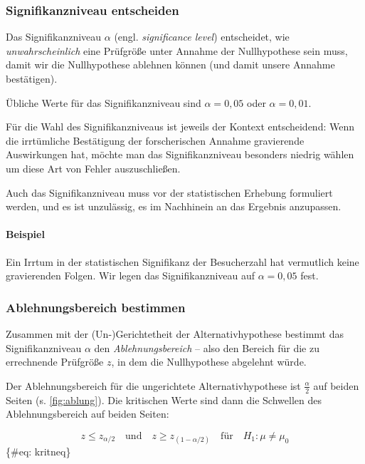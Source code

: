 \documentclass[
  ngerman,
]{article}
\begin{document}
\hypertarget{signifikanzniveau-entscheiden}{%
\subsubsection{Signifikanzniveau entscheiden}\label{signifikanzniveau-entscheiden}}

Das Signifikanzniveau \(\alpha\) (engl. \emph{significance level}) entscheidet, wie \emph{unwahrscheinlich} eine Prüfgröße unter Annahme der Nullhypothese sein muss, damit wir die Nullhypothese ablehnen können (und damit unsere Annahme bestätigen).

Übliche Werte für das Signifikanzniveau sind \(\alpha=0{,}05\) oder \(\alpha=0{,}01\).

Für die Wahl des Signifikanzniveaus ist jeweils der Kontext entscheidend: Wenn die irrtümliche Bestätigung der forscherischen Annahme gravierende Auswirkungen hat, möchte man das Signifikanzniveau besonders niedrig wählen um diese Art von Fehler auszuschließen.

Auch das Signifikanzniveau muss vor der statistischen Erhebung formuliert werden, und es ist unzulässig, es im Nachhinein an das Ergebnis anzupassen.

\hypertarget{beispiel-2}{%
\paragraph{Beispiel}\label{beispiel-2}}

Ein Irrtum in der statistischen Signifikanz der Besucherzahl hat vermutlich keine gravierenden Folgen. Wir legen das Signifikanzniveau auf \(\alpha=0{,}05\) fest.

\hypertarget{ablehnungsbereich-bestimmen}{%
\subsubsection{Ablehnungsbereich bestimmen}\label{ablehnungsbereich-bestimmen}}

Zusammen mit der (Un-)Gerichtetheit der Alternativhypothese bestimmt das Signifikanzniveau \(\alpha\) den \emph{Ablehnungsbereich} -- also den Bereich für die zu errechnende Prüfgröße \(z\), in dem die Nullhypothese abgelehnt würde.

Der Ablehnungsbereich für die ungerichtete Alternativhypothese ist \(\frac{\alpha}{2}\) auf beiden Seiten (s. \autoref{fig:ablung}). Die kritischen Werte sind dann die Schwellen des Ablehnungsbereich auf beiden Seiten:

\[
z \leq z_{\alpha/2} \quad \textrm{und} \quad z \geq z_{(1-\alpha/2)} \quad \textrm{für} \quad H_1: \mu \neq \mu_0
\]\{\#eq: kritneq\}
\end{document}

